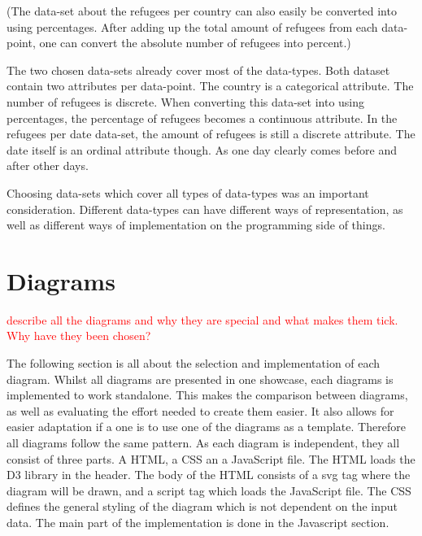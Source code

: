 (The data-set about the refugees per country can also easily be converted into using percentages. After adding up the total amount of refugees from each data-point, one can convert the absolute number of refugees into percent.)


The two chosen data-sets already cover most of the data-types. Both dataset contain two attributes per data-point. The country is a categorical attribute. The number of refugees is discrete. When converting this data-set into using percentages, the percentage of refugees becomes a continuous attribute. In the refugees per date data-set, the amount of refugees is still a discrete attribute. The date itself is an ordinal attribute though. As one day clearly comes before and after other days.

Choosing data-sets which cover all types of data-types was an important consideration. Different data-types can have different ways of representation, as well as different ways of implementation on the programming side of things.


\section{Diagrams}
\textcolor{red}{
describe all the diagrams and why they are special and what makes them tick. Why have they been chosen?}

The following section is all about the selection and implementation of each diagram. Whilst all diagrams are presented in one showcase, each diagrams is implemented to work standalone. This makes the comparison between diagrams, as well as evaluating the effort needed to create them easier. It also allows for easier adaptation if a one is to use one of the diagrams as a template. Therefore all diagrams follow the same pattern. As each diagram is independent, they all consist of three parts. A HTML, a CSS an a JavaScript file. The HTML loads the D3 library in the header. The body of the HTML consists of a svg tag where the diagram will be drawn, and a script tag which loads the JavaScript file. The CSS defines the general styling of the diagram which is not dependent on the input data. The main part of the implementation is done in the Javascript section.

